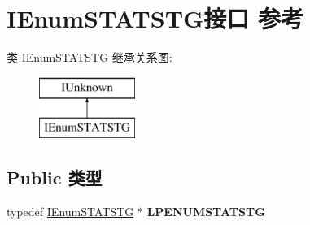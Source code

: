 \hypertarget{interface_i_enum_s_t_a_t_s_t_g}{}\section{I\+Enum\+S\+T\+A\+T\+S\+T\+G接口 参考}
\label{interface_i_enum_s_t_a_t_s_t_g}
类 I\+Enum\+S\+T\+A\+T\+S\+TG 继承关系图\+:\begin{figure}[H]
\begin{center}
\leavevmode
\includegraphics[height=2.000000cm]{interface_i_enum_s_t_a_t_s_t_g}
\end{center}
\end{figure}
\subsection*{Public 类型}
\begin{DoxyCompactItemize}
\item 
\mbox{\label{interface_i_enum_s_t_a_t_s_t_g_a3630a4d87d61f4614b9149b52ef0c681}} 
typedef \hyperlink{interface_i_enum_s_t_a_t_s_t_g}{I\+Enum\+S\+T\+A\+T\+S\+TG} $\ast$ {\bfseries L\+P\+E\+N\+U\+M\+S\+T\+A\+T\+S\+TG}
\end{DoxyCompactItemize}
